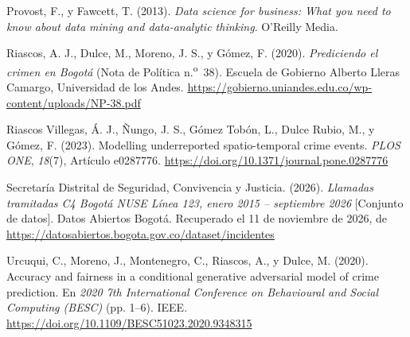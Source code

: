 \documentclass[12pt,letterpaper]{article}
\begin{document}
\begin{thebibliography}{}
Provost, F., y Fawcett, T. (2013). \emph{Data science for business: What you need to know about data mining and data-analytic thinking}. O'Reilly Media.

Riascos, A. J., Dulce, M., Moreno, J. S., y Gómez, F. (2020). \emph{Prediciendo el crimen en Bogotá} (Nota de Política n.\textsuperscript{o}~38). Escuela de Gobierno Alberto Lleras Camargo, Universidad de los Andes. \url{https://gobierno.uniandes.edu.co/wp-content/uploads/NP-38.pdf}

Riascos Villegas, Á. J., Ñungo, J. S., Gómez Tobón, L., Dulce Rubio, M., y Gómez, F. (2023). Modelling underreported spatio-temporal crime events. \emph{PLOS ONE}, \emph{18}(7), Artículo e0287776. \url{https://doi.org/10.1371/journal.pone.0287776}

Secretaría Distrital de Seguridad, Convivencia y Justicia. (2026). \emph{Llamadas tramitadas C4 Bogotá NUSE Línea 123, enero 2015 -- septiembre 2026} [Conjunto de datos]. Datos Abiertos Bogotá. Recuperado el 11 de noviembre de 2026, de \url{https://datosabiertos.bogota.gov.co/dataset/incidentes}

Urcuqui, C., Moreno, J., Montenegro, C., Riascos, A., y Dulce, M. (2020). Accuracy and fairness in a conditional generative adversarial model of crime prediction. En \emph{2020 7th International Conference on Behavioural and Social Computing (BESC)} (pp. 1--6). IEEE. \url{https://doi.org/10.1109/BESC51023.2020.9348315}

\end{thebibliography}

\end{document}
